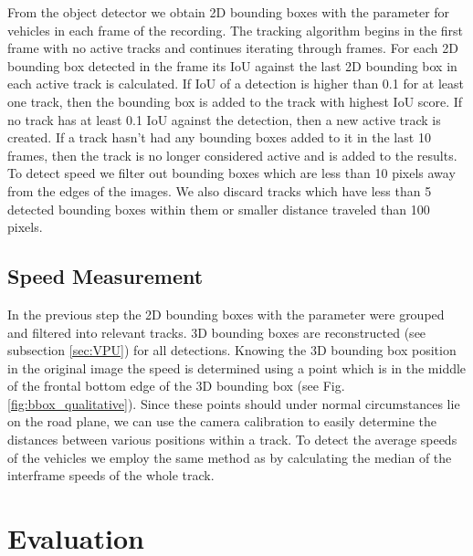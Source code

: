 \documentclass[twocolumn]{svjour3}          \smartqed  \usepackage{graphicx}
\begin{document}
From the object detector we obtain 2D bounding boxes with the parameter  for vehicles in each frame of the recording. The tracking algorithm begins in the first frame with no active tracks and continues iterating through frames. For each 2D bounding box detected in the frame its IoU against the last 2D bounding box in each active track is calculated. If IoU of a detection is higher than 0.1 for at least one track, then the bounding box is added to the track with highest IoU score. If no track has at least 0.1 IoU against the detection, then a new active track is created. If a track hasn't had any bounding boxes added to it in the last 10 frames, then the track is no longer considered active and is added to the results. To detect speed we filter out bounding boxes which are less than 10 pixels away from the edges of the images. We also discard tracks which have less than 5 detected bounding boxes within them or smaller distance traveled than 100 pixels.

\subsection{Speed Measurement}

In the previous step the 2D bounding boxes with the parameter  were grouped and filtered into relevant tracks. 3D bounding boxes are reconstructed (see subsection \ref{sec:VPU}) for all detections. Knowing the 3D bounding box position in the original image the speed is determined using a point which is in the middle of the frontal bottom edge of the 3D bounding box (see Fig. \ref{fig:bbox_qualitative}). Since these points should under normal circumstances lie on the road plane, we can use the camera calibration to easily determine the distances between various positions within a track. To detect the average speeds of the vehicles we employ the same method as \cite{brnocompspeed} by calculating the median of the interframe speeds of the whole track.


\section{Evaluation}
\end{document}
